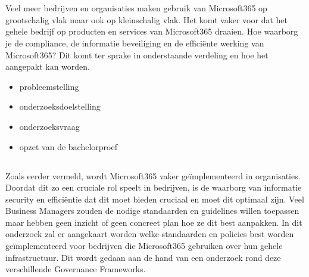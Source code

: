 
\chapter{}%
\label{ch:inleiding}

Veel meer bedrijven en organisaties maken gebruik van Microsoft365 op grootschalig vlak maar ook op kleinschalig vlak.
Het komt vaker voor dat het gehele bedrijf op producten en services van Microsoft365 draaien. Hoe waarborg je de compliance, de informatie beveiliging en de efficiënte werking van Microsoft365?
Dit komt ter sprake in onderstaande verdeling en hoe het aangepakt kan worden.

\begin{itemize}
  \item probleemstelling
  \item onderzoeksdoelstelling
  \item onderzoeksvraag
  \item opzet van de bachelorproef
\end{itemize}

\section{}%
\label{sec:probleemstelling}

Zoals eerder vermeld, wordt Microsoft365 vaker geïmplementeerd in organisaties. Doordat dit zo een cruciale rol speelt in bedrijven, is de waarborg van informatie security en efficiëntie dat dit moet bieden cruciaal en moet dit optimaal zijn.
Veel Business Managers zouden de nodige standaarden en guidelines willen toepassen maar hebben geen inzicht of geen concreet plan hoe ze dit best aanpakken.
In dit onderzoek zal er aangekaart worden welke standaarden en policies best worden geïmplementeerd voor bedrijven die Microsoft365 gebruiken over hun gehele infrastructuur.
Dit wordt gedaan aan de hand van een onderzoek rond deze verschillende Governance Frameworks.


\section{}%
\label{sec:onderzoeksvraag}

